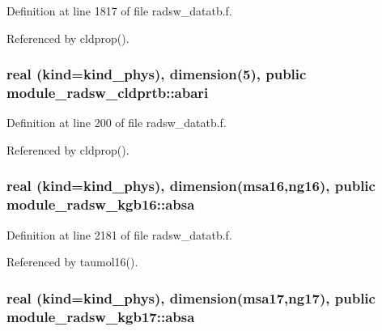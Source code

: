 Definition at line 1817 of file radsw\+\_\+datatb.\+f.



Referenced by cldprop().

\subsubsection[{\texorpdfstring{abari}{abari}}]{\setlength{\rightskip}{0pt plus 5cm}real (kind=kind\+\_\+phys), dimension(5), public module\+\_\+radsw\+\_\+cldprtb\+::abari}\hypertarget{group__module__radsw__main_gace960bbbf15ab3cadbee76301ff111dd}{}\label{group__module__radsw__main_gace960bbbf15ab3cadbee76301ff111dd}


Definition at line 200 of file radsw\+\_\+datatb.\+f.



Referenced by cldprop().

\subsubsection[{\texorpdfstring{absa}{absa}}]{\setlength{\rightskip}{0pt plus 5cm}real (kind=kind\+\_\+phys), dimension(msa16,ng16), public module\+\_\+radsw\+\_\+kgb16\+::absa}\hypertarget{group__module__radsw__main_ga51fe40b5f24cc461850fe5be40d18869}{}\label{group__module__radsw__main_ga51fe40b5f24cc461850fe5be40d18869}


Definition at line 2181 of file radsw\+\_\+datatb.\+f.



Referenced by taumol16().

\subsubsection[{\texorpdfstring{absa}{absa}}]{\setlength{\rightskip}{0pt plus 5cm}real (kind=kind\+\_\+phys), dimension(msa17,ng17), public module\+\_\+radsw\+\_\+kgb17\+::absa}\hypertarget{group__module__radsw__main_ga19083764c3dfe437282b032517baf3ed}{}\label{group__module__radsw__main_ga19083764c3dfe437282b032517baf3ed}


